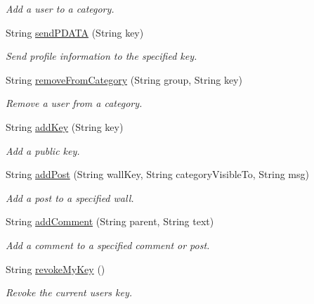 \begin{DoxyCompactItemize}
\begin{DoxyCompactList}\small\item\em Add a user to a category. \end{DoxyCompactList}\item 
String \hyperlink{classballmerpeak_1_1turtlenet_1_1server_1_1TurtlenetImpl_a2436ebfe8ae7ed08b831f21f83aaf3bc}{send\-P\-D\-A\-T\-A} (String key)
\begin{DoxyCompactList}\small\item\em Send profile information to the specified key. \end{DoxyCompactList}\item 
String \hyperlink{classballmerpeak_1_1turtlenet_1_1server_1_1TurtlenetImpl_ae8181f4e329a9ffa1d1b4d5deebf617d}{remove\-From\-Category} (String group, String key)
\begin{DoxyCompactList}\small\item\em Remove a user from a category. \end{DoxyCompactList}\item 
String \hyperlink{classballmerpeak_1_1turtlenet_1_1server_1_1TurtlenetImpl_ac32167a339c28603b6166f7dc605f6b8}{add\-Key} (String key)
\begin{DoxyCompactList}\small\item\em Add a public key. \end{DoxyCompactList}\item 
String \hyperlink{classballmerpeak_1_1turtlenet_1_1server_1_1TurtlenetImpl_ae66b52ba9debe2a2f06e6402d485526c}{add\-Post} (String wall\-Key, String category\-Visible\-To, String msg)
\begin{DoxyCompactList}\small\item\em Add a post to a specified wall. \end{DoxyCompactList}\item 
String \hyperlink{classballmerpeak_1_1turtlenet_1_1server_1_1TurtlenetImpl_a0a6b4c30111bf1c85613b2370c20f464}{add\-Comment} (String parent, String text)
\begin{DoxyCompactList}\small\item\em Add a comment to a specified comment or post. \end{DoxyCompactList}\item 
String \hyperlink{classballmerpeak_1_1turtlenet_1_1server_1_1TurtlenetImpl_a2f380c86cd6789269b156b3a731834ae}{revoke\-My\-Key} ()
\begin{DoxyCompactList}\small\item\em Revoke the current users key. \end{DoxyCompactList}\end{DoxyCompactItemize}
